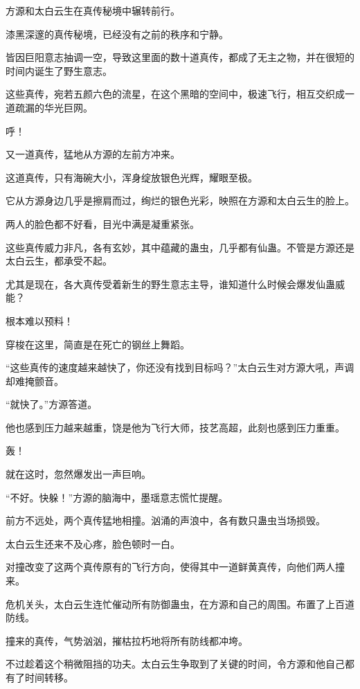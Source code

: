 
\begin{this_body}

方源和太白云生在真传秘境中辗转前行。

漆黑深邃的真传秘境，已经没有之前的秩序和宁静。

皆因巨阳意志抽调一空，导致这里面的数十道真传，都成了无主之物，并在很短的时间内诞生了野生意志。

这些真传，宛若五颜六色的流星，在这个黑暗的空间中，极速飞行，相互交织成一道疏漏的华光巨网。

呼！

又一道真传，猛地从方源的左前方冲来。

这道真传，只有海碗大小，浑身绽放银色光辉，耀眼至极。

它从方源身边几乎是擦肩而过，绚烂的银色光彩，映照在方源和太白云生的脸上。

两人的脸色都不好看，目光中满是凝重紧张。

这些真传威力非凡，各有玄妙，其中蕴藏的蛊虫，几乎都有仙蛊。不管是方源还是太白云生，都承受不起。

尤其是现在，各大真传受着新生的野生意志主导，谁知道什么时候会爆发仙蛊威能？

根本难以预料！

穿梭在这里，简直是在死亡的钢丝上舞蹈。

“这些真传的速度越来越快了，你还没有找到目标吗？”太白云生对方源大吼，声调却难掩颤音。

“就快了。”方源答道。

他也感到压力越来越重，饶是他为飞行大师，技艺高超，此刻也感到压力重重。

轰！

就在这时，忽然爆发出一声巨响。

“不好。快躲！”方源的脑海中，墨瑶意志慌忙提醒。

前方不远处，两个真传猛地相撞。汹涌的声浪中，各有数只蛊虫当场损毁。

太白云生还来不及心疼，脸色顿时一白。

对撞改变了这两个真传原有的飞行方向，使得其中一道鲜黄真传，向他们两人撞来。

危机关头，太白云生连忙催动所有防御蛊虫，在方源和自己的周围。布置了上百道防线。

撞来的真传，气势汹汹，摧枯拉朽地将所有防线都冲垮。

不过趁着这个稍微阻挡的功夫。太白云生争取到了关键的时间，令方源和他自己都有了时间转移。


\end{this_body}
